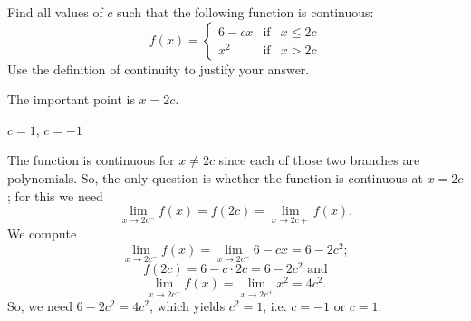 \begin{question}[2015Q]
Find all values of $c$ such that the following function is continuous:
\[f(x)=\left\{\begin{array}{ccc}
6-cx & \text{if} & x\le 2c\\
x^2 &  \text{if} & x> 2c
\end{array}\right.\]Use the definition of continuity to justify your answer.
\end{question}
\begin{hint} The important point is $x=2c$.
\end{hint}
\begin{answer} $c=1$, $c=-1$
\end{answer}
\begin{solution} The function is continuous for $x\ne 2c$ since each of those two branches are
polynomials. So, the only question is whether the function is continuous at
$x=2c$; for this we need
$$\lim_{x\to 2c^-}f(x)=f(2c)=\lim_{x\to 2c+}f(x).$$
We compute
$$\lim_{x\to 2c^-}f(x)=\lim_{x\to 2c^-}6-cx = 6-2c^2;$$
$$f(2c)=6-c\cdot 2c= 6-2c^2\text{ and}$$
$$\lim_{x\to 2c^+}f(x)=\lim_{x\to 2c^+}x^2=4c^2.$$
So, we need $6-2c^2=4c^2$, which yields $c^2=1$, i.e. $c=-1$ or $c=1$.
\end{solution}


\subsection*{\Application}

